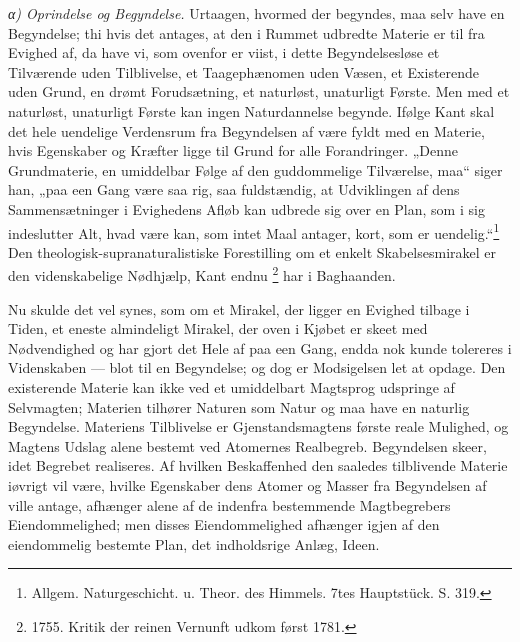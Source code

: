 \documentclass[12pt,a4paper]{book}
\renewcommand{\thefootnote}{*)}
\newcommand{\subrunin}[1]{\emph{#1}\hspace{0.4em}}
\begin{document}
\subrunin{α) Oprindelse og Begyndelse.} Urtaagen, hvormed der begyndes, maa
selv have en Begyndelse; thi hvis det antages, at den i Rummet udbredte Materie
er til fra Evighed af, da have vi, som ovenfor er viist, i dette
Begyndelsesløse et Tilværende uden Tilblivelse, et Taagephænomen uden Væsen, et
Existerende uden Grund, en drømt Forudsætning, et naturløst, unaturligt Første.
Men med et naturløst, unaturligt Første kan ingen Naturdannelse begynde. Ifølge
Kant skal det hele uendelige Verdensrum fra Begyndelsen af være fyldt med en
Materie, hvis Egenskaber og Kræfter ligge til Grund for alle Forandringer.
„Denne Grundmaterie, en umiddelbar Følge af den guddommelige Tilværelse, maa“
siger han, „paa een Gang være saa rig, saa fuldstændig, at Udviklingen af dens
Sammensætninger i Evighedens Afløb kan udbrede sig over en Plan, som i sig
indeslutter Alt, hvad være kan, som intet Maal antager, kort, som er
uendelig.“\footnote{%
Allgem. Naturgeschicht. u. Theor. des Himmels. 7tes Hauptstück. S. 319.} Den
theologisk-supranaturalistiske Forestilling om et enkelt Skabelsesmirakel er
den videnskabelige Nødhjælp, Kant endnu%
\renewcommand{\thefootnote}{**)}%
\footnote{%
1755. Kritik der reinen Vernunft udkom først 1781.}%
\renewcommand{\thefootnote}{*)}
har i Baghaanden.

Nu skulde det vel synes, som om et Mirakel, der ligger en Evighed tilbage i
Tiden, et eneste almindeligt Mirakel, der oven i Kjøbet er skeet med
Nødvendighed og har gjort det Hele af paa een Gang, endda nok kunde tolereres i
Videnskaben --- blot til en Begyndelse; og dog er Modsigelsen let at opdage.
Den existerende Materie kan ikke ved et umiddelbart Magtsprog udspringe af
Selvmagten; Materien tilhører Naturen som Natur og maa have en naturlig
Begyndelse. Materiens Tilblivelse er Gjenstandsmagtens første reale Mulighed,
og Magtens Udslag alene bestemt ved Atomernes Realbegreb. Begyndelsen skeer,
idet Begrebet realiseres. Af hvilken Beskaffenhed den saaledes tilblivende
Materie iøvrigt vil være, hvilke Egenskaber dens Atomer og Masser fra
Begyndelsen af ville antage, afhænger alene af de indenfra bestemmende
Magtbegrebers Eiendommelighed; men disses Eiendommelighed afhænger igjen af den
eiendommelig bestemte Plan, det indholdsrige Anlæg, Ideen.
\end{document}
